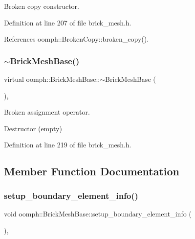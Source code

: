 Broken copy constructor. 



Definition at line 207 of file brick\+\_\+mesh.\+h.



References oomph\+::\+Broken\+Copy\+::broken\+\_\+copy().

\mbox{\label{classoomph_1_1BrickMeshBase_adc436f1ef22908929e148f420f4e11b9}} 
\subsubsection{\texorpdfstring{$\sim$\+Brick\+Mesh\+Base()}{~BrickMeshBase()}}
{\footnotesize\ttfamily virtual oomph\+::\+Brick\+Mesh\+Base\+::$\sim$\+Brick\+Mesh\+Base (\begin{DoxyParamCaption}{ }\end{DoxyParamCaption})\hspace{0.3cm}{\ttfamily [inline]}, {\ttfamily [virtual]}}



Broken assignment operator. 

Destructor (empty) 

Definition at line 219 of file brick\+\_\+mesh.\+h.



\subsection{Member Function Documentation}
\mbox{\label{classoomph_1_1BrickMeshBase_aa2d28d573a5dadd0ddef912e2a2c6828}} 
\subsubsection{\texorpdfstring{setup\+\_\+boundary\+\_\+element\+\_\+info()}{setup\_boundary\_element\_info()}\hspace{0.1cm}{\footnotesize\ttfamily [1/2]}}
{\footnotesize\ttfamily void oomph\+::\+Brick\+Mesh\+Base\+::setup\+\_\+boundary\+\_\+element\+\_\+info (\begin{DoxyParamCaption}{ }\end{DoxyParamCaption})\hspace{0.3cm}{\ttfamily [inline]}, {\ttfamily [virtual]}}

